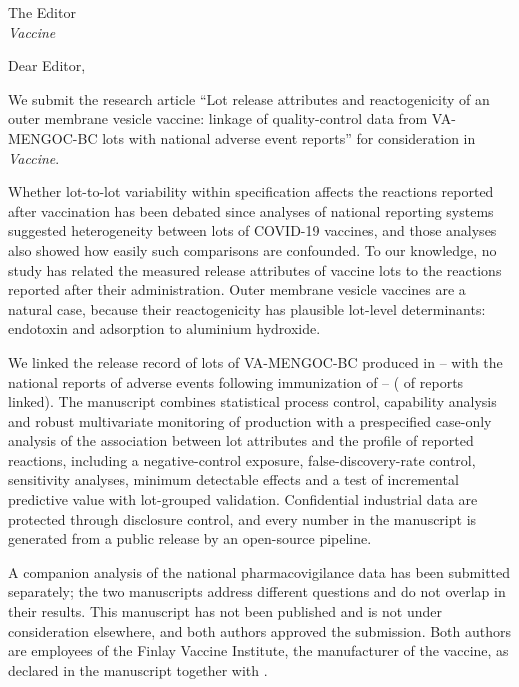 \documentclass[11pt]{article}
\begin{document}
\SyntheticNotice
\LetterHead
The Editor\\ \emph{Vaccine}

Dear Editor,

We submit the research article ``Lot release attributes and reactogenicity of an outer membrane
vesicle vaccine: linkage of quality-control data from \PTNLots{} VA-MENGOC-BC lots with national
adverse event reports'' for consideration in \emph{Vaccine}.

Whether lot-to-lot variability within specification affects the reactions reported after
vaccination has been debated since analyses of national reporting systems suggested heterogeneity
between lots of COVID-19 vaccines, and those analyses also showed how easily such comparisons are
confounded. To our knowledge, no study has related the measured release attributes of vaccine lots
to the reactions reported after their administration. Outer membrane vesicle vaccines are a natural
case, because their reactogenicity has plausible lot-level determinants: endotoxin and adsorption to
aluminium hydroxide.

We linked the release record of \PTNLots{} lots of VA-MENGOC-BC produced in
\PTLotFirstYear--\PTLotLastYear{} with the national reports of adverse events following immunization
of \VStudyFirstYear--\VStudyLastYear{} (\PTLinkRate{} of reports linked). The manuscript combines
statistical process control, capability analysis and robust multivariate monitoring of production
with a prespecified case-only analysis of the association between lot attributes and the profile of
reported reactions, including a negative-control exposure, false-discovery-rate control,
sensitivity analyses, minimum detectable effects and a test of incremental predictive value with
lot-grouped validation. Confidential industrial data are protected through disclosure control, and
every number in the manuscript is generated from a public release by an open-source pipeline.

A companion analysis of the national pharmacovigilance data has been submitted separately; the two
manuscripts address different questions and do not overlap in their results. This manuscript has
not been published and is not under consideration elsewhere, and both authors approved the
submission. Both authors are employees of the Finlay Vaccine Institute, the manufacturer of the
vaccine, as declared in the manuscript together with .

\LetterSignature
\end{document}
